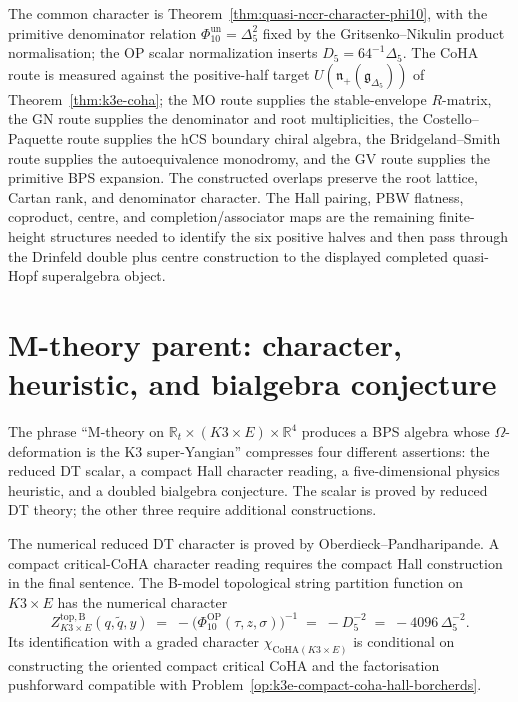 \begin{remark}
The common character is Theorem~\ref{thm:quasi-nccr-character-phi10},
with the primitive denominator relation
\(\Phi_{10}^{\mathrm{un}}=\Delta_5^2\) fixed by the Gritsenko--Nikulin
product normalisation; the OP scalar normalization inserts
\(D_5=64^{-1}\Delta_5\). The CoHA route is measured against the positive-half
target \(U(\mathfrak n_+(\mathfrak g_{\Delta_5}))\) of
Theorem~\ref{thm:k3e-coha}; the MO route supplies the stable-envelope
\(R\)-matrix, the GN route supplies the denominator and root
multiplicities, the Costello--Paquette route supplies the hCS boundary
chiral algebra, the Bridgeland--Smith route supplies the autoequivalence
monodromy, and the GV route supplies the primitive BPS expansion.
The constructed overlaps preserve the root lattice, Cartan rank, and
denominator character. The Hall pairing, PBW flatness, coproduct,
centre, and completion/associator maps are the remaining finite-height
structures needed to identify the six positive halves and then pass
through the Drinfeld double plus centre construction to the displayed
completed quasi-Hopf superalgebra object.
\end{remark}

\section{M-theory parent: character, heuristic, and bialgebra conjecture}
\label{sec:m-theory-parent-stratification-k3e}

The phrase ``M-theory on $\mathbb{R}_t \times (K3 \times E) \times \mathbb{R}^4$ produces a BPS algebra whose $\Omega$-deformation is the K3 super-Yangian'' compresses four different assertions: the reduced DT scalar, a compact Hall character reading, a five-dimensional physics heuristic, and a doubled bialgebra conjecture. The scalar is proved by reduced DT theory; the other three require additional constructions.

\begin{theorem}
\label{thm:m-theory-parent-character-level-k3e}
The numerical reduced DT character is proved by
Oberdieck--Pandharipande. A compact critical-CoHA character reading
requires the compact Hall construction in the final sentence.
The B-model topological string partition function on $K3 \times E$ has
the numerical character
\[
 Z^{\mathrm{top, B}}_{K3 \times E}(q, \tilde q, y)
 \;=\;
 -\bigl(\Phi_{10}^{\mathrm{OP}}(\tau,z,\sigma)\bigr)^{-1}
 \;=\;
 -D_5^{-2}
 \;=\;
 -4096\,\Delta_5^{-2}.
\]
Its identification with a graded character
\(\chi_{\mathrm{CoHA}(K3\times E)}\) is conditional on constructing the
oriented compact critical CoHA and the factorisation pushforward
compatible with Problem~\ref{op:k3e-compact-coha-hall-borcherds}.
\end{theorem}

